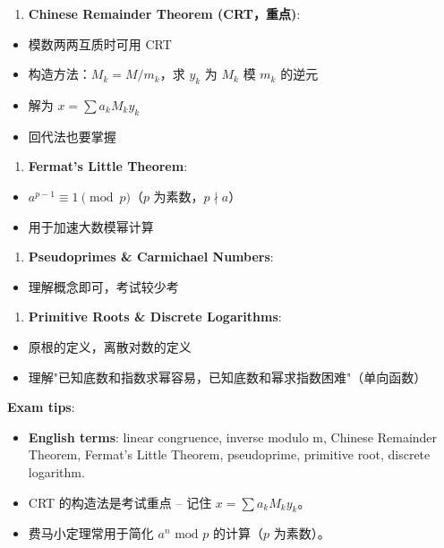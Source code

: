 \documentclass[10pt,a4paper,openany]{ctexbook}
\theoremstyle{definition}
\theoremstyle{remark}
\begin{document}
\begin{enumerate}
\item \textbf{Chinese Remainder Theorem (CRT，重点)}:
\end{enumerate}

\begin{itemize}
\item 模数两两互质时可用 CRT
\item 构造方法：$M_k = M/m_k$，求 $y_k$ 为 $M_k$ 模 $m_k$ 的逆元
\item 解为 $x = \sum a_k M_k y_k$
\item 回代法也要掌握

\end{itemize}

\begin{enumerate}
\item \textbf{Fermat's Little Theorem}:
\end{enumerate}

\begin{itemize}
\item $a^{p-1} \equiv 1 \pmod{p}$（$p$ 为素数，$p \nmid a$）
\item 用于加速大数模幂计算

\end{itemize}

\begin{enumerate}
\item \textbf{Pseudoprimes \& Carmichael Numbers}:
\end{enumerate}

\begin{itemize}
\item 理解概念即可，考试较少考

\end{itemize}

\begin{enumerate}
\item \textbf{Primitive Roots \& Discrete Logarithms}:
\end{enumerate}

\begin{itemize}
\item 原根的定义，离散对数的定义
\item 理解"已知底数和指数求幂容易，已知底数和幂求指数困难"（单向函数）

\end{itemize}

\textbf{Exam tips}:
\begin{itemize}
\item \textbf{English terms}: linear congruence, inverse modulo m, Chinese Remainder Theorem, Fermat's Little Theorem, pseudoprime, primitive root, discrete logarithm.
\item CRT 的构造法是考试重点 -- 记住 $x = \sum a_k M_k y_k$。
\item 费马小定理常用于简化 $a^n \text{ mod } p$ 的计算（$p$ 为素数）。

\end{itemize}
\end{document}
